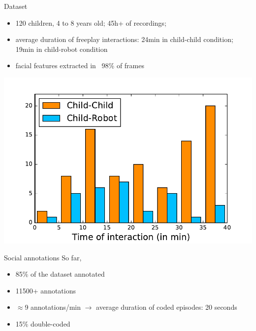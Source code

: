 \documentclass[compress]{beamer}
\begin{document}

\begin{frame}{Dataset}
    \begin{itemize}
        \item 120 children, 4 to 8 years old; 45h+ of recordings;
     \item average duration of freeplay interactions: 24min in child-child
         condition; 19min in child-robot condition
     \item facial features extracted in ~98\% of frames
    \end{itemize}

    \begin{center}
        \includegraphics[width=0.5\linewidth]{freeplay/durations}
    \end{center}
\end{frame}




\begin{frame}{Social annotations}
    So far,
    \begin{itemize}
        \item 85\% of the dataset annotated
        \item 11500+ annotations
        \item $\approx$9 annotations/min $\rightarrow$ average duration of coded
            episodes: 20 seconds
        \item 15\% double-coded
    \end{itemize}
\end{frame}


\end{document}
